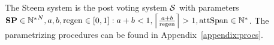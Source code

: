 \begin{definition}
  The Steem system is the post voting system $\pvs$ with parameters $\stpowvec
  \in {\mathbb{N}^*}^N, a, b, \regen \in \left[0, 1\right]: a + b < 1,
  \ceil*{\frac{a + b}{\regen}} > 1, \attspan \in \mathbb{N}^*$. The
  parametrizing procedures can be found in Appendix~\ref{appendix:procs}.
\end{definition}
